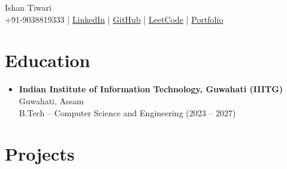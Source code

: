 \documentclass[11pt, a4paper]{article}
\begin{document}
\begin{center}
  {\Large \faEnvelope Ishan Tiwari} \\
  {\faPhone +91-9038819333} | \href{https://www.linkedin.com/}{LinkedIn} | \href{https://github.com/}{GitHub} | \href{https://leetcode.com/}{LeetCode} | \href{https://ishan11032005@github.io/}{Portfolio}
\end{center}

\vspace{0.5cm}

\section{Education}

\begin{itemize}[left=0.5cm]
  \item \textbf{Indian Institute of Information Technology, Guwahati (IIITG)} \\
    Guwahati, Assam \\
    B.Tech – Computer Science and Engineering (2023 – 2027)
\end{itemize}

\vspace{0.3cm}

\section{Projects}
\end{document}
